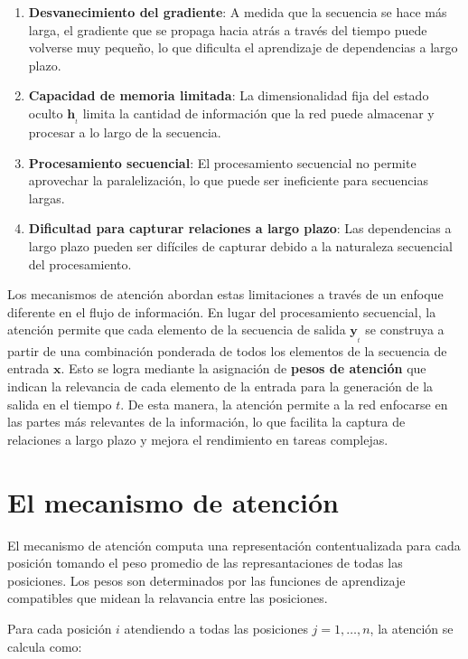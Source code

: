 \begin{enumerate}
    \item \textbf{Desvanecimiento del gradiente}: A medida que la secuencia se hace más larga, el gradiente que se propaga
          hacia atrás a través del tiempo puede volverse muy pequeño, lo que dificulta el aprendizaje de dependencias a largo
          plazo.
    \item \textbf{Capacidad de memoria limitada}: La dimensionalidad fija del estado oculto \(\pmb{h}_{_t}\) limita la
          cantidad de información que la red puede almacenar y procesar a lo largo de la secuencia.
    \item \textbf{Procesamiento secuencial}: El procesamiento secuencial no permite aprovechar la paralelización, lo que
          puede ser ineficiente para secuencias largas.
    \item \textbf{Dificultad para capturar relaciones a largo plazo}: Las dependencias a largo plazo pueden ser difíciles de
          capturar debido a la naturaleza secuencial del procesamiento.
\end{enumerate}

Los mecanismos de atención abordan estas limitaciones a través de un enfoque diferente en el flujo de información. En
lugar del procesamiento secuencial, la atención permite que cada elemento de la secuencia de salida \(\pmb{y}_{_t}\) se
construya a partir de una combinación ponderada de todos los elementos de la secuencia de entrada \(\pmb{x}\). Esto se
logra mediante la asignación de \textbf{pesos de atención} que indican la relevancia de cada elemento de la entrada
para la generación de la salida en el tiempo \(t\). De esta manera, la atención permite a la red enfocarse en las
partes más relevantes de la información, lo que facilita la captura de relaciones a largo plazo y mejora el rendimiento
en tareas complejas.

\section{El mecanismo de atención}

El mecanismo de atención computa una representación contentualizada para cada posición tomando el peso promedio de las
represantaciones de todas las posiciones. Los pesos son determinados por las funciones de aprendizaje compatibles que
midean la relavancia entre las posiciones.

Para cada posición $i$ atendiendo a todas las posiciones $j = 1, \dots, n$, la atención se calcula como:

